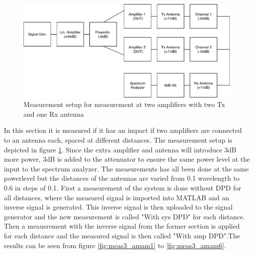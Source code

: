 \begin{figure}[H]
\centering 
\includegraphics[scale = 0.9]{figures/measurement/cree/meas3/meas3.pdf}
\caption{Measurement setup for measurement at two amplifiers with two Tx and one Rx antenna}
\label{fig:meas_amp3}
\end{figure}

In this section it is measured if it has an impact if two amplifiers are connected to an antenna each, spaced at different distances. The measurement setup is depicted in figure \ref{fig:meas_amp3}. Since the extra amplifier and antenna will introduce 3dB more power, 3dB is added to the attenuator to ensure the same power level at the input to the spectrum analyzer. The measurements has all been done at the same powerlevel but the distances of the antennas are varied from 0.1 wavelength to 0.6 in steps of 0.1. First a measurement of the system is done without DPD for all distances, where the measured signal is imported into MATLAB and an inverse signal is generated. This inverse signal is then uploaded to the signal generator and the new measurement is called "With sys DPD" for each distance. Then a meausrement with the inverse signal from the former section is applied for each distance and the measured signal is then called "With amp DPD".The results can be seen from figure \ref{fig:meas3_amam1} to \ref{fig:meas3_amam6}.   


